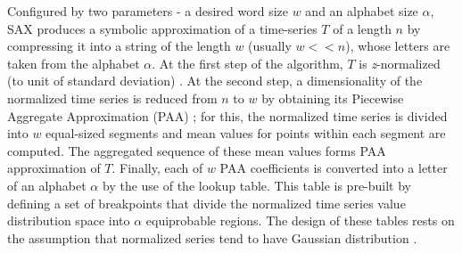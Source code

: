 \documentclass[conference]{IEEEtran}
\begin{document}

Configured by two parameters - a desired word size $w$ and an alphabet size $\alpha$,
SAX produces a symbolic approximation of a time-series $T$ of a length $n$ by compressing 
it into a string of the length $w$ (usually $w<<n$), whose letters are taken from 
the alphabet $\alpha$. 
At the first step of the algorithm, $T$ is \textit{z}-normalized (to unit of standard deviation)
\cite{goldin_kanellakis}. 
At the second step, a dimensionality of the normalized time series is reduced from $n$ to $w$ by
obtaining its Piecewise Aggregate Approximation (PAA) \cite{paa}; for this, the normalized time
series is divided into $w$ equal-sized segments and mean values for points within each segment are computed.
The aggregated sequence of these mean values forms PAA approximation of $T$. Finally, each of $w$
PAA coefficients is converted into a letter of an alphabet $\alpha$ by the use of the lookup table.
This table is pre-built by defining a set of breakpoints that divide the normalized time series
value distribution space into $\alpha$ equiprobable regions. 
The design of these tables rests on the assumption 
that normalized series tend to have Gaussian distribution \cite{hot_sax}.
\end{document}
